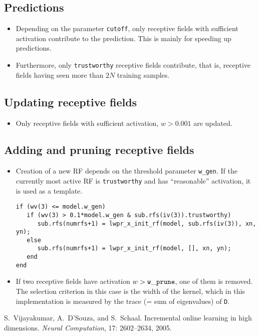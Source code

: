 \documentclass[11pt,a4paper]{article}
\newcommand{\var}[1]{{\tt #1}}
\begin{document}
\subsection{Predictions}
\begin{itemize}
\item Depending on the parameter \var{cutoff}, only receptive fields with
sufficient activation contribute to the prediction. This is mainly for
speeding up predictions.
\item Furthermore, only \var{trustworthy} receptive fields contribute, 
that is, receptive fields having seen more than $2N$ training 
samples.
\end{itemize}

\subsection{Updating receptive fields}
\begin{itemize}
\item Only receptive fields with sufficient activation, $w>0.001$ 
are updated.
\end{itemize}

\subsection{Adding and pruning receptive fields}
\begin{itemize}
\item Creation of a new RF depends on the threshold parameter
\var{w\_gen}. If the currently most active RF is \var{trustworthy}
and has ``reasonable'' activation, it is used as a template.
\begin{verbatim}
if (wv(3) <= model.w_gen)
   if (wv(3) > 0.1*model.w_gen & sub.rfs(iv(3)).trustworthy)
      sub.rfs(numrfs+1) = lwpr_x_init_rf(model, sub.rfs(iv(3)), xn, yn);
   else
      sub.rfs(numrfs+1) = lwpr_x_init_rf(model, [], xn, yn);
   end
end
\end{verbatim}
\item If two receptive fields have activation $w>\var{w\_prune}$,
one of them is removed. The selection criterion in this case is
the width of the kernel, which in this implementation is measured
by the trace (= sum of eigenvalues) of \var{D}.
\end{itemize}

\begin{thebibliography}{9}
S.~Vijayakumar, A.~D'Souza, and S.~Schaal.
\newblock Incremental online learning in high dimensions.
\newblock \emph{Neural Computation}, 17: 2602--2634, 2005.

\end{thebibliography}
\end{document}
